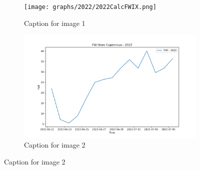 \begin{figure}[h]
	\caption{HELLo}
	\centering
	\begin{subfigure}{0.49\textwidth}
		\centering
		\texttt{[image: graphs/2022/2022CalcFWIX.png]}
		\caption{Caption for image 1}
		\label{fig:img1}
	\end{subfigure}
	\hfill
	\begin{subfigure}{0.49\textwidth}
		\centering
		\includegraphics[width=\textwidth]{graphs/2022/2022CopernicusFWI12.png}
		\caption{Caption for image 2}
		\label{fig:img2}
	\end{subfigure}
	\label{fig:both_images}
\end{figure}

\FloatBarrier

